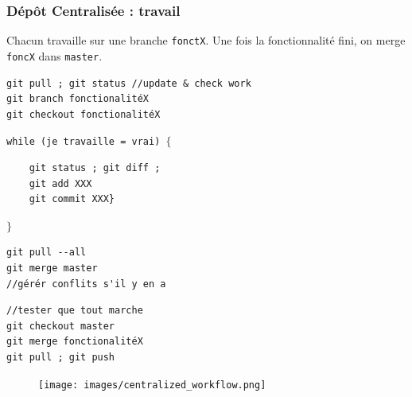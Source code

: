 \documentclass[table,tikz,12pt,svgnames]{beamer}
\begin{document}

\begin{frame}[fragile]
\frametitle{Dépôt Centralisée : travail}
\begin{adjustwidth}{-1em}{0cm}{}
\vspace{-2.3em}
\color{darkgreen}%
Chacun travaille sur une branche \texttt{fonctX}. Une fois la fonctionnalité fini, on merge \texttt{foncX} dans \texttt{master}.\\
\color{black}
\vspace{-1em}
\begin{verbatim}
git pull ; git status //update & check work
git branch fonctionalitéX
git checkout fonctionalitéX
\end{verbatim}

\texttt{while (je travaille = vrai) $\{$}
\begin{verbatim}
	git status ; git diff ;
	git add XXX
	git commit XXX}
\end{verbatim}
\texttt{$\}$}
\begin{verbatim}
git pull --all
git merge master
//gérér conflits s'il y en a
\end{verbatim}
\begin{verbatim}
//tester que tout marche
git checkout master
git merge fonctionalitéX
git pull ; git push
\end{verbatim}
\end{adjustwidth}

\vspace{-12em}

\begin{adjustwidth}{-0cm}{-1cm}{}
	\begin{figure}
		\hfill
		\texttt{[image: images/centralized\_workflow.png]}
	\end{figure}
\end{adjustwidth}


\end{frame}
\end{document}
